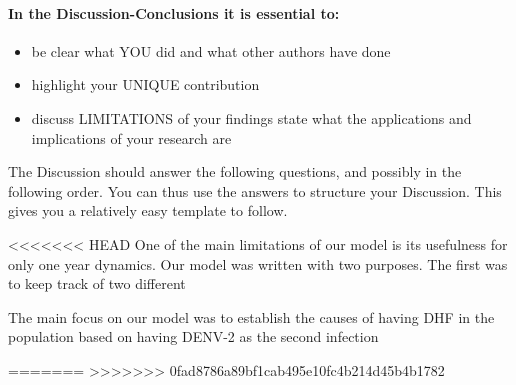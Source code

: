 \paragraph{In the Discussion-Conclusions it is essential to:}

\begin{itemize}
    \item
        be clear what YOU did and what other authors have done
    \item
        highlight your UNIQUE contribution
    
    \item
        discuss LIMITATIONS of your findings state what the
         applications and implications of your research are
\end{itemize}

The Discussion should answer the following questions, and possibly in the following order. 
You can thus use the answers to structure your Discussion. This gives you
a relatively easy template to follow.

<<<<<<< HEAD
\noindent One of the main limitations of our model is its usefulness for only one year dynamics. 
Our model was written with two purposes. The first was to keep track of two different 

The main focus on our model was to establish the causes of having DHF in the population based on
having DENV-2 as the second infection 

=======
>>>>>>> 0fad8786a89bf1cab495e10fc4b214d45b4b1782

